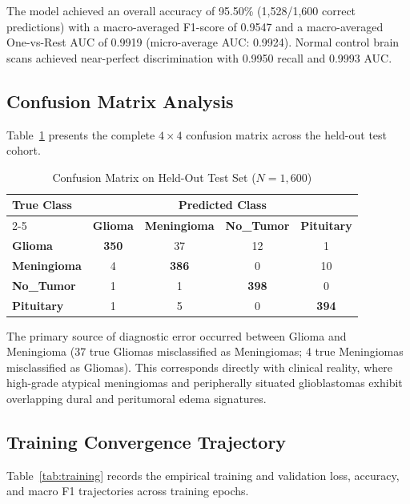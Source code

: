 \documentclass[journal,twocolumn,10pt]{IEEEtran}
\begin{document}
The model achieved an overall accuracy of 95.50\% (1,528/1,600 correct predictions) with a macro-averaged F1-score of 0.9547 and a macro-averaged One-vs-Rest AUC of 0.9919 (micro-average AUC: 0.9924). Normal control brain scans achieved near-perfect discrimination with 0.9950 recall and 0.9993 AUC.

\subsection{Confusion Matrix Analysis}
Table~\ref{tab:confusion} presents the complete $4 \times 4$ confusion matrix across the held-out test cohort.

\begin{table}[htbp]
\caption{Confusion Matrix on Held-Out Test Set ($N = 1,600$)}
\label{tab:confusion}
\centering
\begin{tabular}{lcccc}
\toprule
\textbf{True Class} & \multicolumn{4}{c}{\textbf{Predicted Class}} \\
\cmidrule(lr){2-5}
 & \textbf{Glioma} & \textbf{Meningioma} & \textbf{No\_Tumor} & \textbf{Pituitary} \\
\midrule
\textbf{Glioma} & \textbf{350} & 37 & 12 & 1 \\
\textbf{Meningioma} & 4 & \textbf{386} & 0 & 10 \\
\textbf{No\_Tumor} & 1 & 1 & \textbf{398} & 0 \\
\textbf{Pituitary} & 1 & 5 & 0 & \textbf{394} \\
\bottomrule
\end{tabular}
\end{table}

The primary source of diagnostic error occurred between Glioma and Meningioma (37 true Gliomas misclassified as Meningiomas; 4 true Meningiomas misclassified as Gliomas). This corresponds directly with clinical reality, where high-grade atypical meningiomas and peripherally situated glioblastomas exhibit overlapping dural and peritumoral edema signatures.

\subsection{Training Convergence Trajectory}
Table~\ref{tab:training} records the empirical training and validation loss, accuracy, and macro F1 trajectories across training epochs.
\end{document}

